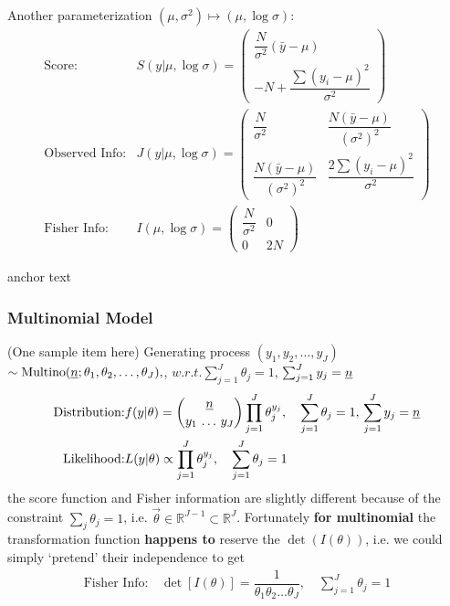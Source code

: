 Another parameterization $ (\mu ,\sigma ^2)\mapsto (\mu ,\log \sigma ) $:
\begin{align*}
    \text{Score:}&S(y|\mu ,\log \sigma )= \begin{pmatrix}
        \dfrac{N}{\sigma ^2}(\bar{y}-\mu )\\
        -N+\dfrac{\sum (y_i-\mu )^2 }{\sigma ^2}
    \end{pmatrix}\\
    \text{Observed Info:}&J(y|\mu ,\log\sigma )= \begin{pmatrix}
        \dfrac{N}{\sigma ^2}&\dfrac{N(\bar{y}-\mu )}{(\sigma ^2)^2}\\
        \dfrac{N(\bar{y}-\mu )}{(\sigma ^2)^2}&\dfrac{2\sum (y_i-\mu )^2}{\sigma ^2}
    \end{pmatrix}\\
    \text{Fisher Info:}&I(\mu ,\log \sigma )=\begin{pmatrix}
        \dfrac{N}{\sigma ^2}&0\\
        0&2N
    \end{pmatrix}
\end{align*}


\hypertarget{NormalConjugate}{anchor text}







\subsubsection{Multinomial Model}\label{SubSubSectionBayesianMultinom}

(One sample item here) Generating process $ (y_1,y_2,\ldots,y_J) $ $ \sim \mathrm{Multino}(\underline{n};\theta _1,\theta _2,\ldots,\theta _J)  ,$, $w.r.t. \sum_{j=1}^J \theta _j = 1$, $ \sum_{j=1}^Jy_j=\underline{n} $ 
\begin{align*}
    \text{Distribution:}&f(y|\theta  )=\binom{\underline{n}}{y _1\,\ldots\,y _J}\prod_{j=1}^J \theta _j^{y_j},\quad \sum_{j=1}^J\theta _j=1,\,\sum_{j=1}^Jy_j=\underline{n}\\
    \text{Likelihood:}&L(y|\theta )\propto\prod_{j=1}^J \theta _j^{y_j},\quad \sum_{j=1}^J\theta _j=1
\end{align*}
    the score function and Fisher information are slightly different because of the constraint $ \sum_{j}\theta _j=1 $, i.e. $ \vec{\theta }\in \mathbb{R}^{J-1}\subset \mathbb{R}^J $. Fortunately \textbf{for multinomial} the transformation function \textbf{happens to} reserve the $\det(I(\theta ))$, i.e. we could simply `pretend' their independence to get 
    \begin{align*}
        \text{Fisher Info:}&\,\det\left[ I(\theta )\right]=\dfrac{1}{\theta _1\theta _2\ldots \theta _J},\quad \sum_{j=1}^J\theta _j=1
    \end{align*}
    
